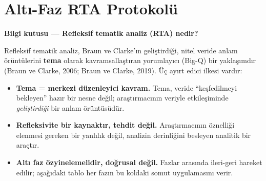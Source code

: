 \documentclass[
  turkish,
  a4paper,
  DIV=11,
  numbers=noendperiod]{scrreprt}
\providecommand{\tightlist}{%
  \setlength{\itemsep}{0pt}\setlength{\parskip}{0pt}}
\begin{document}
\section{Altı-Faz RTA Protokolü}\label{altux131-faz-rta-protokoluxfc}

\begin{tcolorbox}[enhanced jigsaw, arc=.35mm, bottomrule=.15mm, bottomtitle=1mm, breakable, colback=white, colbacktitle=quarto-callout-note-color!10!white, colframe=quarto-callout-note-color-frame, coltitle=black, left=2mm, leftrule=.75mm, opacityback=0, opacitybacktitle=0.6, rightrule=.15mm, title=\textcolor{quarto-callout-note-color}{\faInfo}\hspace{0.5em}{Not}, titlerule=0mm, toprule=.15mm, toptitle=1mm]

\textbf{Bilgi kutusu --- Refleksif tematik analiz (RTA) nedir?}

Refleksif tematik analiz, Braun ve Clarke'ın geliştirdiği, nitel veride
anlam örüntülerini \textbf{tema} olarak kavramsallaştıran yorumlayıcı
(Big-Q) bir yaklaşımdır (Braun ve Clarke, 2006; Braun ve Clarke, 2019).
Üç ayırt edici ilkesi vardır:

\begin{itemize}
\tightlist
\item
  \textbf{Tema = merkezi düzenleyici kavram.} Tema, veride
  ``keşfedilmeyi bekleyen'' hazır bir nesne değil; araştırmacının
  veriyle etkileşiminde \emph{geliştirdiği} bir anlam örüntüsüdür.
\item
  \textbf{Refleksivite bir kaynaktır, tehdit değil.} Araştırmacının
  öznelliği elenmesi gereken bir yanlılık değil, analizin derinliğini
  besleyen analitik bir araçtır.
\item
  \textbf{Altı faz özyinelemelidir, doğrusal değil.} Fazlar arasında
  ileri-geri hareket edilir; aşağıdaki tablo her fazın bu koldaki somut
  uygulamasını verir.
\end{itemize}

\end{tcolorbox}
\end{document}
